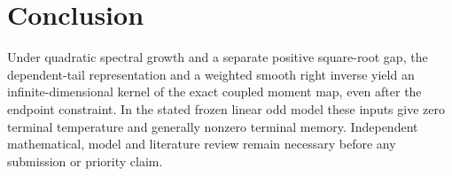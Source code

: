 \section{Conclusion}
Under quadratic spectral growth and a separate positive square-root gap, the dependent-tail representation and a weighted smooth right inverse yield an infinite-dimensional kernel of the exact coupled moment map, even after the endpoint constraint. In the stated frozen linear odd model these inputs give zero terminal temperature and generally nonzero terminal memory. Independent mathematical, model and literature review remain necessary before any submission or priority claim.
